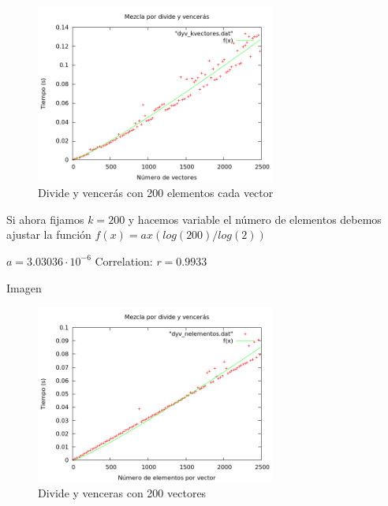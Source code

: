 \begin{frame}[Imagen]
	\begin{block}
	
	\begin{figure}[h] 
	\centering
	\includegraphics[width=0.7\textwidth]{../Obligatorio/Graficas/dyv_kvectores.png}
	\caption{Divide y vencerás con 200 elementos cada vector} 
	\end{figure}
	
	\end{block}
\end{frame}

\begin{frame}
	\begin{block}
	
	Si ahora fijamos $k=200$ y hacemos variable el n\'umero de elementos debemos ajustar 			la funci\'on $f(x) = ax(log(200)/log(2))$

	\begin{center}
	$a               = 3.03036\cdot 10^{-6}$
	Correlation:  $r = 0.9933$
	\end{center}
	\end{block}
\end{frame}

\begin{frame}{Imagen}
	\begin{block}{ }
	
	\begin{figure}[h] 
	\centering
	\includegraphics[width=0.7\textwidth]{../Obligatorio/Graficas/dyv_nelementos.png}
	\caption{Divide y venceras con 200 vectores} 
	\label{fig:d_nelementos} 
	\end{figure}
	
	\end{block}
\end{frame}



